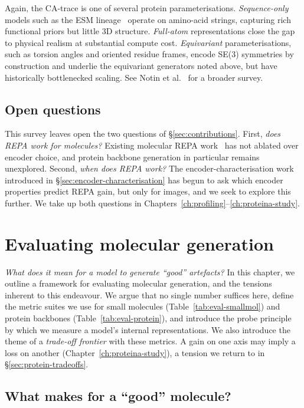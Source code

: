 \documentclass[12pt,a4paper,twoside]{report}
\begin{document}
Again, the CA-trace is one of several protein parameterisations. \emph{Sequence-only} models such as the ESM lineage~\cite{ESM2} operate on amino-acid strings, capturing rich functional priors but little 3D structure. \emph{Full-atom} representations close the gap to physical realism at substantial compute cost. \emph{Equivariant} parameterisations, such as torsion angles and oriented residue frames, encode SE(3) symmetries by construction and underlie the equivariant generators noted above, but have historically bottlenecked scaling. See Notin et al.~\cite{NotinProteinDesign} for a broader survey.

\section{Open questions}
\label{sec:open-questions}


This survey leaves open the two questions of \S\ref{sec:contributions}. First, \emph{does REPA work for molecules?} Existing molecular REPA work~\cite{REED,BoltzREPA} has not ablated over encoder choice, and protein backbone generation in particular remains unexplored. Second, \emph{when does REPA work?} The encoder-characterisation work introduced in \S\ref{sec:encoder-characterisation} has begun to ask which encoder properties predict REPA gain, but only for images, and we seek to explore this further. We take up both questions in Chapters~\ref{ch:profiling}--\ref{ch:proteina-study}.

\chapter{Evaluating molecular generation}
\label{ch:evaluation}



\emph{What does it mean for a model to generate ``good'' artefacts?} In this chapter, we outline a framework for evaluating molecular generation, and the tensions inherent to this endeavour. We argue that no single number suffices here, define the metric suites we use for small molecules (Table~\ref{tab:eval-smallmol}) and protein backbones (Table~\ref{tab:eval-protein}), and introduce the probe principle by which we measure a model's internal representations. We also introduce the theme of a \emph{trade-off frontier} with these metrics. A gain on one axis may imply a loss on another (Chapter~\ref{ch:proteina-study}), a tension we return to in \S\ref{sec:protein-tradeoffs}.

\section{What makes for a ``good'' molecule?}
\label{sec:eval-good}
\end{document}
